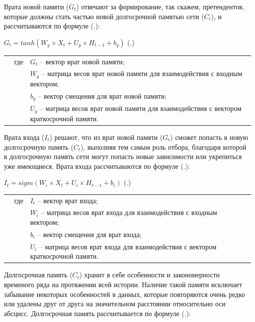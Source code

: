 {  \par \redline Врата новой памяти ($G_t$) отвечают за формирование, так скажем, претендентов, которые должны стать частью новой долгосрочной памятью сети ($C_t$), и рассчитываются по формуле (\thechaptercntr .\theformulacntr):

  \formulaspace \par \redline 
    $G_t = tanh(W_g \times X_t + U_g \times H_{t-1} + b_g)$
    \hfill (\thechaptercntr .\theformulacntr) \redline
  \formulaspace \addtocounter{formulacntr}{1}

  \begin{tabular}{p{}p{}p{}}
		& где  & $G_t$ {--} вектор врат новой памяти; \\
		& 	   & $W_g$ {--} матрица весов врат новой памяти для взаимодействия с входным вектором; \\
    & 	   & $b_g$ {--} вектор смещения для врат новой памяти; \\
    & 	   & $U_g$ {--} матрица весов врат новой памяти для взаимодействия с вектором краткосрочной памяти. \\
  \end{tabular}

  \par \redline Врата входа ($I_t$) решают, что из врат новой памяти ($G_t$) сможет попасть в новую долгосрочную память ($C_t$), выполняя тем самым роль отбора, благодаря которой в долгосрочную память сети могут попасть новые зависимости или укрепиться уже имеющиеся. Врата входа рассчитываются по формуле (\thechaptercntr .\theformulacntr):

  \formulaspace \par \redline 
    $I_t = sigm(W_i \times X_t + U_i \times H_{t-1} + b_i)$
    \hfill (\thechaptercntr .\theformulacntr) \redline
  \formulaspace \addtocounter{formulacntr}{1}

  \begin{tabular}{p{}p{}p{}}
		& где  & $I_t$ {--} вектор врат входа; \\
		& 	   & $W_i$ {--} матрица весов врат входа для взаимодействия с входным вектором; \\
    & 	   & $b_i$ {--} вектор смещения для врат входа; \\
    & 	   & $U_i$ {--} матрица весов врат входа для взаимодействия с вектором краткосрочной памяти. \\
  \end{tabular}

  \par \redline Долгосрочная память ($C_t$) хранит в себе особенности и закономерности временого ряда на протяжении всей истории. Наличие такой памяти исключает забывание некоторых особенностей в данных, которые повторяются очень редко или удалены друг от друга на значительном расстоянии относительно оси абсцисс. Долгосрочная память рассчитывается по формуле (\thechaptercntr .\theformulacntr):

}
